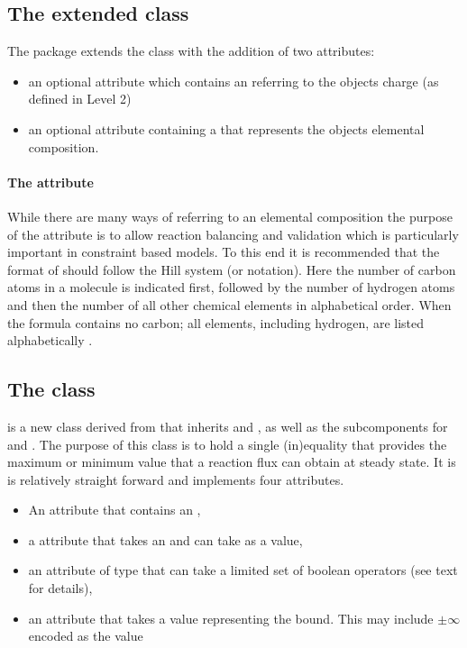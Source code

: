 \subsection{The extended  class}
\label{sbml-species}
\label{species-class}

The \FBC package extends the \SBML \Species class with the addition of two attributes:
\begin{itemize}
  \item an optional attribute  which contains an  referring to the \Species objects charge (as defined in \SBML Level 2)
  \item an optional attribute  containing a  that represents the \Species objects elemental composition.
\end{itemize}

\paragraph{The  attribute}
\label{chemicalFormula-attribute}
While there are many ways of referring to an elemental composition the purpose of the  attribute is to allow reaction balancing and validation which is particularly important in constraint based models. To this end it is recommended that the format of  should follow the Hill system (or notation). Here the number of carbon atoms in a molecule is indicated first, followed by the number of hydrogen atoms and then the number of all other chemical elements in alphabetical order. When the formula contains no carbon; all elements, including hydrogen, are listed alphabetically \cite{hillsystem, hillwikipedia}.

\subsection{The \FBC {} class}
\label{fluxbound-class}

\FluxBound is a new \FBC class derived from \SBML \SBase that inherits  and , as well as the subcomponents for \Annotation and \Notes. The purpose of this class is to hold a single (in)equality that provides the maximum or minimum value that a reaction flux can obtain at steady state. It is is relatively straight forward and implements four attributes.

\begin{itemize}
  \item An  attribute that contains an ,
  \item a  attribute that takes an  and can take \SBML \Reaction {} as a value,
  \item an  attribute of type  that can take a limited set of boolean operators (see text for details),
  \item {} an attribute that takes a  value representing the bound. This may include $\pm\infty$ encoded as the value 
\end{itemize}


